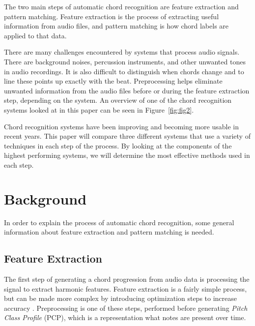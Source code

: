 \documentclass{sig-alternate}
\begin{document}
The two main steps of automatic chord recognition are feature extraction and pattern matching. Feature extraction is the process of extracting useful information from audio files, and pattern matching is how chord labels are applied to that data. 

There are many challenges encountered by systems that process audio signals. There are background noises, percussion instruments, and other unwanted tones in audio recordings. It is also difficult to distinguish when chords change and to line these points up exactly with the beat. Preprocessing helps eliminate unwanted information from the audio files before or during the feature extraction step, depending on the system. An overview of one of the chord recognition systems looked at in this paper can be seen in Figure~\ref{fig:fig2}.

Chord recognition systems have been improving and becoming more usable in recent years. This paper will compare three different systems that use a variety of techniques in each step of the process. By looking at the components of the highest performing systems, we will determine the most effective methods used in each step. 

\begin{figure*}
\centering
{}
\caption{Overview of the chord recognition system used in~\cite{Morman:2006}.}
\label{fig:fig2}
\end{figure*}  

\section{Background}
In order to explain the process of automatic chord recognition, some general information about feature extraction and pattern matching is needed.

\subsection{Feature Extraction}

The first step of generating a chord progression from audio data is processing the signal to extract harmonic features. Feature extraction is a fairly simple process, but can be made more complex by introducing optimization steps to increase accuracy \cite{McVicar:2014}. Preprocessing is one of these steps, performed before generating \textit{Pitch Class Profile} (PCP), which is a representation what notes are present over time.
\end{document}
